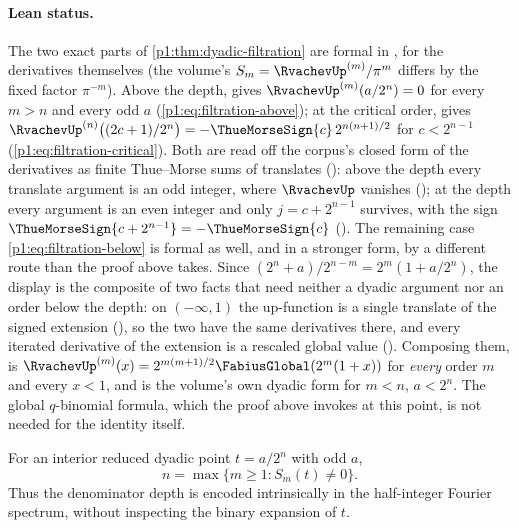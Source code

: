 \documentclass[11pt,oneside]{article}
\theoremstyle{definition}
\theoremstyle{remark}
\begin{document}
\paragraph{Lean status.}
The two exact parts of \cref{p1:thm:dyadic-filtration} are formal in
, for the derivatives themselves (the volume's
\(S_m=\RvachevUp^{(m)}/\pi^m\) differs by the fixed factor \(\pi^{-m}\)).  Above the depth,
 gives
\(\RvachevUp^{(m)}(a/2^n)=0\) for every \(m>n\) and every odd \(a\)
(\eqref{p1:eq:filtration-above}); at the critical order,
 gives
\(\RvachevUp^{(n)}\bigl((2c+1)/2^n\bigr)=-\ThueMorseSign{c}\,2^{n(n+1)/2}\) for
\(c<2^{n-1}\) (\eqref{p1:eq:filtration-critical}).  Both are read off the corpus's closed
form of the derivatives as finite Thue--Morse sums of translates
(): above the depth every translate
argument is an odd integer, where \(\RvachevUp\) vanishes
(); at the depth every argument is an even
integer and only \(j=c+2^{n-1}\) survives, with the sign
\(\ThueMorseSign{c+2^{n-1}}=-\ThueMorseSign{c}\) ().
The remaining case \eqref{p1:eq:filtration-below} is formal as well, and in a stronger
form, by a different route than the proof above takes.  Since
\((2^n+a)/2^{n-m}=2^m(1+a/2^n)\), the display is the composite of two facts that need
neither a dyadic argument nor an order below the depth: on \((-\infty,1)\) the up-function is a
single translate of the signed extension
(), so the two have the same derivatives
there, and every iterated derivative of the extension is a rescaled global value
().  Composing them,
 is
\(\RvachevUp^{(m)}(x)=2^{m(m+1)/2}\FabiusGlobal(2^m(1+x))\) for \emph{every} order \(m\) and
every \(x<1\), and  is the volume's own
dyadic form for \(m<n\), \(a<2^n\).  The global \(q\)-binomial formula, which the proof above
invokes at this point, is not needed for the identity itself.

\begin{corollary}\label{p1:cor:denominator-detection}
For an interior reduced dyadic point $t=a/2^n$ with odd $a$,
\begin{equation}\label{p1:eq:denominator-detection}
 n=\max\{m\ge1:S_m(t)\ne0\}.
\end{equation}
Thus the denominator depth is encoded intrinsically in the half-integer
Fourier spectrum, without inspecting the binary expansion of $t$.
\end{corollary}
\end{document}
